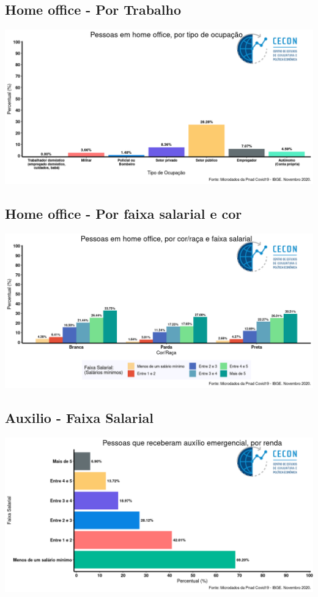 \documentclass{SelfArx}
\begin{document}
\subsection*{Home office - Por Trabalho}
\label{sec:org8102984}
\begin{center}
\includegraphics[width=.9\linewidth]{./figs/PNAD_COVID/home_emprego.png}
\end{center}

\subsection*{Home office - Por faixa salarial e cor}
\label{sec:org978debc}
\begin{center}
\includegraphics[width=.9\linewidth]{./figs/PNAD_COVID/home_renda.png}
\end{center}
\subsection*{Auxilio - Faixa Salarial}
\label{sec:org6fdc94c}
\begin{center}
\includegraphics[width=.9\linewidth]{./figs/PNAD_COVID/auxilio_renda.png}
\end{center}
\end{document}
